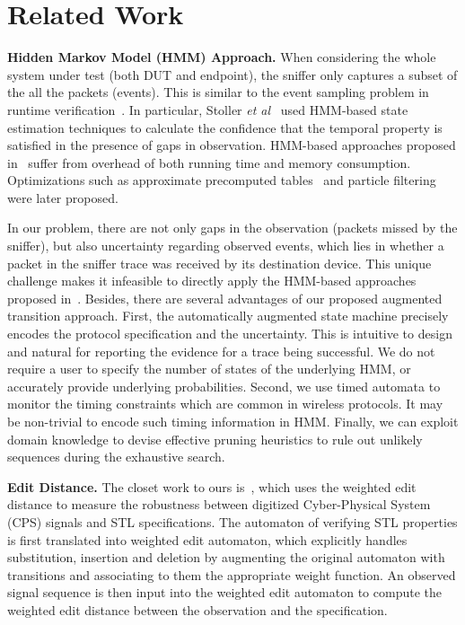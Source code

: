 \section{Related Work}
\label{sec:related}

\textbf{Hidden Markov Model (HMM) Approach.} When considering the whole system
under test (both DUT and endpoint), the sniffer only captures a subset of the
all the packets (events).  This is similar to the event sampling problem in
runtime
verification~\cite{bonakdarpour2011sampling,hauswirth2004low,arnold2008qvm,fei2006artemis,basin2012monitoring,sistla2011runtime}.
In particular, Stoller \textit{et al}~\cite{stoller2011runtime} used HMM-based
state estimation techniques to calculate the confidence that the temporal
property is satisfied in the presence of gaps in observation. HMM-based
approaches proposed in~\cite{stoller2011runtime} suffer from overhead of both
running time and memory consumption. Optimizations 
such as approximate precomputed tables~\cite{bartocci2012adaptive} and particle
filtering~\cite{kalajdzic2013runtime} were later proposed.

In our problem, there are not only gaps in the observation (packets missed by the
sniffer), but also uncertainty regarding observed events, which lies in whether
a packet in the sniffer trace was received by its destination device. This
unique challenge makes it infeasible to directly apply the HMM-based approaches
proposed in~\cite{stoller2011runtime}.
Besides, there are several advantages of our proposed augmented transition
approach. First, the automatically augmented state machine precisely encodes the
protocol specification and the uncertainty. This is intuitive to design and
natural for
reporting the evidence for a trace being successful. We do not require a user
to specify the number of states of the underlying HMM, or accurately provide
underlying probabilities. Second, we use timed automata to monitor the timing
constraints which are common in wireless protocols. It may be non-trivial to
encode such timing information in HMM. Finally, we can exploit domain knowledge
to devise effective pruning heuristics to rule out unlikely sequences during the
exhaustive search. 

\textbf{Edit Distance.} The closet work to ours
is~\cite{jakvsic2016quantitative}, which uses the weighted edit distance to
measure the robustness between digitized Cyber-Physical System (CPS) signals and
STL specifications. The automaton of verifying STL properties is first
translated into weighted edit automaton, which explicitly handles substitution,
insertion and deletion by augmenting the original automaton with transitions and
associating to them the appropriate weight function. An observed signal sequence
is then input into the weighted edit automaton to compute the weighted edit
distance between the observation and the specification.

